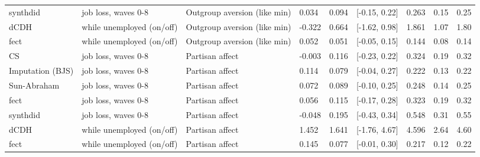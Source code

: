 \begin{tabular}{lllllllll}
synthdid & job loss, waves 0-8 & Outgroup aversion (like min) & 0.034 & 0.094 & {}[-0.15, 0.22] & 0.263 & 0.15 & 0.25\\
dCDH & while unemployed (on/off) & Outgroup aversion (like min) & -0.322 & 0.664 & {}[-1.62, 0.98] & 1.861 & 1.07 & 1.80\\
fect & while unemployed (on/off) & Outgroup aversion (like min) & 0.052 & 0.051 & {}[-0.05, 0.15] & 0.144 & 0.08 & 0.14\\
CS & job loss, waves 0-8 & Partisan affect & -0.003 & 0.116 & {}[-0.23, 0.22] & 0.324 & 0.19 & 0.32\\
Imputation (BJS) & job loss, waves 0-8 & Partisan affect & 0.114 & 0.079 & {}[-0.04, 0.27] & 0.222 & 0.13 & 0.22\\
Sun-Abraham & job loss, waves 0-8 & Partisan affect & 0.072 & 0.089 & {}[-0.10, 0.25] & 0.248 & 0.14 & 0.25\\
fect & job loss, waves 0-8 & Partisan affect & 0.056 & 0.115 & {}[-0.17, 0.28] & 0.323 & 0.19 & 0.32\\
synthdid & job loss, waves 0-8 & Partisan affect & -0.048 & 0.195 & {}[-0.43, 0.34] & 0.548 & 0.31 & 0.55\\
dCDH & while unemployed (on/off) & Partisan affect & 1.452 & 1.641 & {}[-1.76, 4.67] & 4.596 & 2.64 & 4.60\\
fect & while unemployed (on/off) & Partisan affect & 0.145 & 0.077 & {}[-0.01, 0.30] & 0.217 & 0.12 & 0.22\\
\bottomrule
\end{tabular}
